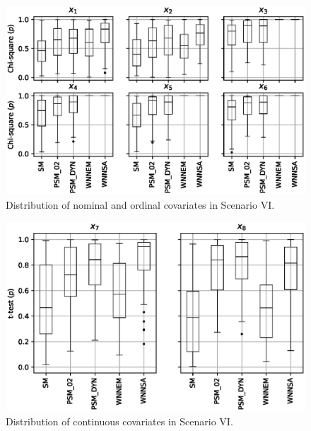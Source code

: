 		\begin{figure}[h]
			\centering
                \captionsetup{justification=centering}
			\includegraphics[width=\textwidth]{assets/figures/control_group_selection/wnnsa/scenVI/distribution_chi.eps}
			\caption{Distribution of nominal and ordinal covariates in Scenario VI. %
			}
			\label{fig:wnnsa_distribution_chi}    
		\end{figure}
								
		\begin{figure}[h]
			\centering
                \captionsetup{justification=centering}
			\includegraphics[width=.8\textwidth]{assets/figures/control_group_selection/wnnsa/scenVI/distribution_t.eps}
			\caption{Distribution of continuous covariates in Scenario VI.%
			}
			\label{fig:wnnsa_distribution_t}    
		\end{figure}

